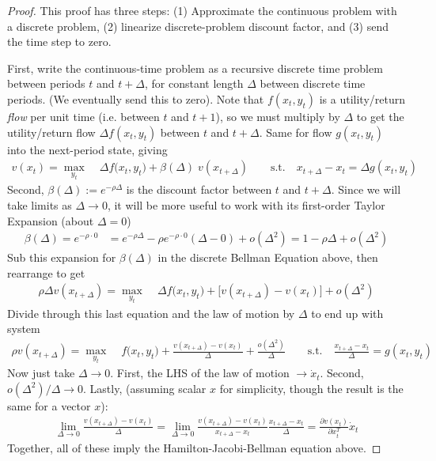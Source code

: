 \documentclass[12pt]{article}
\numberwithin{equation}{section} %
\theoremstyle{plain}
\theoremstyle{definition}
\theoremstyle{remark}
\newcommand{\ra}{\rightarrow}
\begin{document}
\begin{proof}
This proof has three steps: (1) Approximate the continuous problem with
a discrete problem, (2) linearize discrete-problem discount factor,
and (3) send the time step to zero.

First, write the continuous-time problem as a recursive discrete time
problem between periods $t$ and $t+\Delta$, for constant length $\Delta$
between discrete time periods. (We eventually send this to zero).
Note that $f(x_t,y_t)$ is a utility/return \emph{flow} per unit time
(i.e.  between $t$ and $t+1$), so we must multiply by $\Delta$
to get the utility/return flow $\Delta f(x_t,y_t)$ between $t$ and
$t+\Delta$.
Same for flow $g(x_t,y_t)$ into the next-period state, giving
\begin{align*}
  v(x_t) = \max_{y_t}\;
  &\Delta f(x_t,y_t\big)
  + \beta(\Delta)\;v(x_{t+\Delta})
  \qquad
  \text{s.t.}\quad
  x_{t+\Delta}-x_t = \Delta g(x_t,y_t)
\end{align*}
Second, $\beta(\Delta):=e^{-\rho \Delta}$ is the discount factor between
$t$ and $t+\Delta$. Since we will take limits as $\Delta\ra 0$, it will
be more useful to work with its first-order Taylor Expansion (about
$\Delta=0$)
\begin{align*}
  \beta(\Delta)
  = e^{-\rho \cdot 0}
  &=
  e^{-\rho\Delta}
  -\rho e^{-\rho \cdot 0}
  (\Delta-0)
  + o(\Delta^2)
  =
  1-\rho\Delta + o(\Delta^2)
\end{align*}
Sub this expansion for $\beta(\Delta)$ in the discrete Bellman Equation
above, then rearrange to get
\begin{align*}
  \rho\Delta v(x_{t+\Delta})
  = \max_{y_t}\;
  &\Delta f(x_t,y_t\big)
  +
  \big[
  v(x_{t+\Delta}) - v(x_t)
  \big]
  + o(\Delta^2)
\end{align*}
Divide through this last equation and the law of motion by $\Delta$ to
end up with system
\begin{align*}
  \rho v(x_{t+\Delta})
  = \max_{y_t}\;
  & f(x_t,y_t\big)
  +
  \frac{v(x_{t+\Delta}) - v(x_t)}{\Delta}
  + \frac{o(\Delta^2)}{\Delta}
  \qquad
  \text{s.t.}\quad
   \frac{x_{t+\Delta}-x_t}{\Delta} = g(x_t,y_t)
\end{align*}
Now just take $\Delta\ra 0$.
First, the LHS of the law of motion $\ra \dot{x}_t$.
Second, $o(\Delta^2)/\Delta \ra 0$.
Lastly, (assuming scalar $x$ for simplicity, though the result is the
same for a vector $x$):
\begin{align*}
  \lim_{\Delta\ra 0}
  \frac{v(x_{t+\Delta}) - v(x_t)}{\Delta}
  =
  \lim_{\Delta\ra 0}
  \frac{v(x_{t+\Delta}) - v(x_t)}{x_{t+\Delta}-x_t}
  \frac{x_{t+\Delta}-x_t}{\Delta}
  = \frac{\partial v(x_t)}{\partial x_t^T}\dot{x}_t
\end{align*}
Together, all of these imply the Hamilton-Jacobi-Bellman equation above.
\end{proof}
\end{document}
